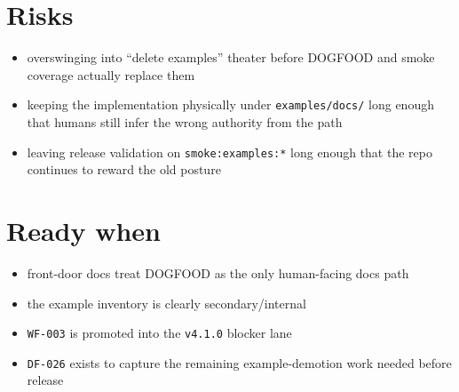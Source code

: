\section{Risks}\label{record-086-risks}

\begin{itemize}
\tightlist
\item
  overswinging into ``delete examples'' theater before DOGFOOD and smoke coverage actually replace them
\item
  keeping the implementation physically under \texttt{e\allowbreak{}x\allowbreak{}a\allowbreak{}m\allowbreak{}p\allowbreak{}l\allowbreak{}e\allowbreak{}s\allowbreak{}/\allowbreak{}d\allowbreak{}o\allowbreak{}c\allowbreak{}s\allowbreak{}/} long enough that humans still infer the wrong authority from the path
\item
  leaving release validation on \texttt{s\allowbreak{}m\allowbreak{}o\allowbreak{}k\allowbreak{}e\allowbreak{}:\allowbreak{}e\allowbreak{}x\allowbreak{}a\allowbreak{}m\allowbreak{}p\allowbreak{}l\allowbreak{}e\allowbreak{}s\allowbreak{}:\allowbreak{}*} long enough that the repo continues to reward the old posture
\end{itemize}

\section{Ready when}\label{record-086-ready-when}

\begin{itemize}
\tightlist
\item
  front-door docs treat DOGFOOD as the only human-facing docs path
\item
  the example inventory is clearly secondary/internal
\item
  \texttt{W\allowbreak{}F\allowbreak{}-\allowbreak{}0\allowbreak{}0\allowbreak{}3} is promoted into the \texttt{v\allowbreak{}4\allowbreak{}.\allowbreak{}1\allowbreak{}.\allowbreak{}0} blocker lane
\item
  \texttt{D\allowbreak{}F\allowbreak{}-\allowbreak{}0\allowbreak{}2\allowbreak{}6} exists to capture the remaining example-demotion work needed before release
\end{itemize}

